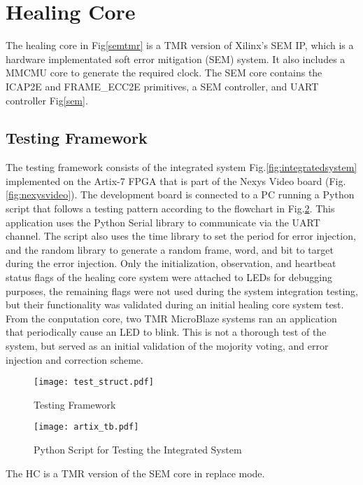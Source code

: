 \section{Healing Core}
The healing core in Fig\ref{semtmr} is a TMR version of Xilinx's SEM IP, which is a hardware implementated soft error mitigation (SEM) system. It also includes a MMCMU core to generate the required clock. The SEM core contains the ICAP2E and FRAME_ECC2E primitives, a SEM controller, and UART controller Fig\ref{sem}. 


\subsection{Testing Framework}
The testing framework consists of the integrated system Fig.\ref{fig:integratedsystem} implemented on the Artix-7 FPGA that is part of the Nexys Video board (Fig.\ref{fig:nexysvideo}). The development board is connected to a PC running a Python script that follows a testing pattern according to the flowchart in Fig.\ref{fig:flowchart}. This application uses the Python Serial library to communicate via the UART channel. The script also uses the time library to set the period for error injection, and the random library to generate a random frame, word, and bit to target during the error injection. Only the initialization, observation, and heartbeat status flags of the healing core system were attached to LEDs for debugging purposes, the remaining flags were not used during the system integration testing, but their functionality was validated during an initial healing core system test. From the conputation core, two TMR MicroBlaze systems ran an application that periodically cause an LED to blink. This is not a thorough test of the system, but served as an initial validation of the mojority voting, and error injection and correction scheme.

\begin{figure}[!ht]
    \centering
        \texttt{[image: test\_struct.pdf]}
        \caption{Testing Framework}
    \label{fig:tstruct}
\end{figure}

\begin{figure}[!ht]
    \centering
        \texttt{[image: artix\_tb.pdf]}
        \caption{Python Script for Testing the Integrated System}
    \label{fig:flowchart}
\end{figure}

The HC is a TMR version of the SEM core in replace mode. 

